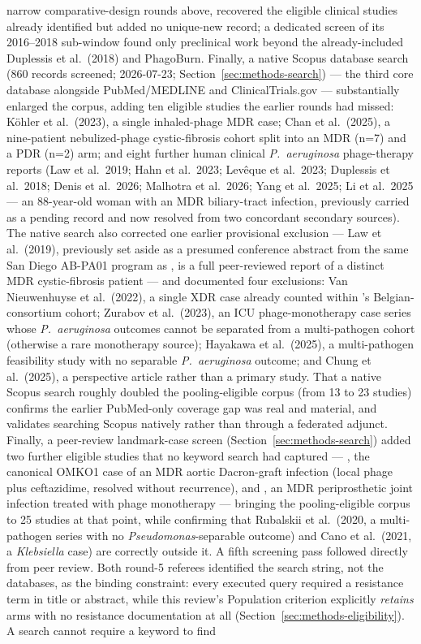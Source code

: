 narrow comparative-design rounds above, recovered the eligible clinical studies already identified but added no unique-new record; a dedicated screen of its 2016--2018 sub-window found only preclinical work beyond the already-included Duplessis et al.\ (2018) and PhagoBurn. Finally, a native Scopus database search (860 records screened; 2026-07-23; Section~\ref{sec:methods-search}) --- the third core database alongside PubMed/MEDLINE and ClinicalTrials.gov --- substantially enlarged the corpus, adding ten eligible studies the earlier rounds had missed: K\"ohler et al.\ (2023), a single inhaled-phage MDR case; Chan et al.\ (2025), a nine-patient nebulized-phage cystic-fibrosis cohort split into an MDR (n=7) and a PDR (n=2) arm; and eight further human clinical \textit{P.\ aeruginosa} phage-therapy reports (Law et al.\ 2019; Hahn et al.\ 2023; Lev\^eque et al.\ 2023; Duplessis et al.\ 2018; Denis et al.\ 2026; Malhotra et al.\ 2026; Yang et al.\ 2025; Li et al.\ 2025 --- an 88-year-old woman with an MDR biliary-tract infection, previously carried as a pending record and now resolved from two concordant secondary sources). The native search also corrected one earlier provisional exclusion --- Law et al.\ (2019), previously set aside as a presumed conference abstract from the same San Diego AB-PA01 program as \textcite{Aslam2019_ajt}, is a full peer-reviewed report of a distinct MDR cystic-fibrosis patient --- and documented four exclusions: Van Nieuwenhuyse et al.\ (2022), a single XDR case already counted within \textcite{Pirnay2024_natmicrobiol}'s Belgian-consortium cohort; Zurabov et al.\ (2023), an ICU phage-monotherapy case series whose \textit{P.\ aeruginosa} outcomes cannot be separated from a multi-pathogen cohort (otherwise a rare monotherapy source); Hayakawa et al.\ (2025), a multi-pathogen feasibility study with no separable \textit{P.\ aeruginosa} outcome; and Chung et al.\ (2025), a perspective article rather than a primary study. That a native Scopus search roughly doubled the pooling-eligible corpus (from 13 to 23 studies) confirms the earlier PubMed-only coverage gap was real and material, and validates searching Scopus natively rather than through a federated adjunct. Finally, a peer-review landmark-case screen (Section~\ref{sec:methods-search}) added two further eligible studies that no keyword search had captured --- \textcite{Chan2018_omko1_emph}, the canonical OMKO1 case of an MDR aortic Dacron-graft infection (local phage plus ceftazidime, resolved without recurrence), and \textcite{Arya2026_pji_natcomms}, an MDR periprosthetic joint infection treated with phage monotherapy --- bringing the pooling-eligible corpus to 25 studies at that point, while confirming that Rubalskii et al.\ (2020, a multi-pathogen series with no \textit{Pseudomonas}-separable outcome) and Cano et al.\ (2021, a \textit{Klebsiella} case) are correctly outside it. A fifth screening pass followed directly from peer review. Both round-5 referees identified the search string, not the databases, as the binding constraint: every executed query required a resistance term in title or abstract, while this review's Population criterion explicitly \emph{retains} arms with no resistance documentation at all (Section~\ref{sec:methods-eligibility}). A search cannot require a keyword to find 